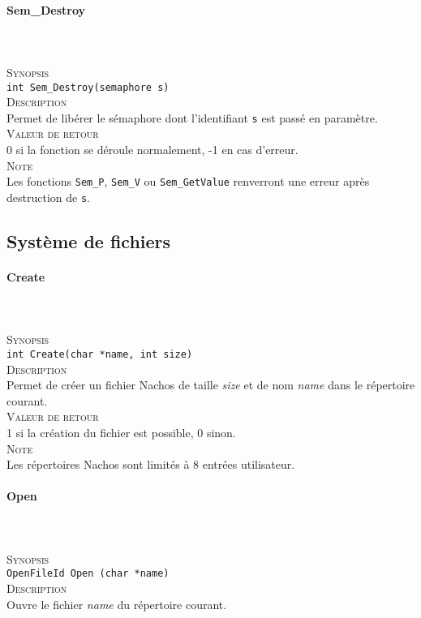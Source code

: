 \documentclass{report}
\newcommand{\myparagraph}[1]{\paragraph*{#1}\mbox{}\\}
\begin{document}
\myparagraph{Sem\_Destroy}\\
\textsc{Synopsis}\\	
	\texttt{int Sem\_Destroy(semaphore s)}\\

\textsc{Description}\\
	Permet de libérer le sémaphore dont l'identifiant \texttt{s} est passé en paramètre.\\

\textsc{Valeur de retour}\\
0 si la fonction se déroule normalement, -1 en cas d'erreur.\\
	
\textsc{Note}\\
	Les fonctions \texttt{Sem\_P}, \texttt{Sem\_V} ou \texttt{Sem\_GetValue} renverront une erreur après destruction de \texttt{s}.\\
\newpage

\subsection*{Système de fichiers}
\myparagraph{Create}\\

\textsc{Synopsis}\\	
	\texttt{int Create(char *name, int size)}\\
	
\textsc{Description}\\
	Permet de créer un fichier Nachos de taille \textit{size} et de nom \textit{name} dans le répertoire courant.\\	

\textsc{Valeur de retour}\\
1 si la création du fichier est possible, 0 sinon.\\

\textsc{Note}\\
	Les répertoires Nachos sont limités à 8 entrées utilisateur.\\
\myparagraph{Open}\\

\textsc{Synopsis}\\	
	\texttt{OpenFileId Open (char *name)}\\
	
\textsc{Description}\\
	Ouvre le fichier \textit{name} du répertoire courant.\\	
\end{document}
